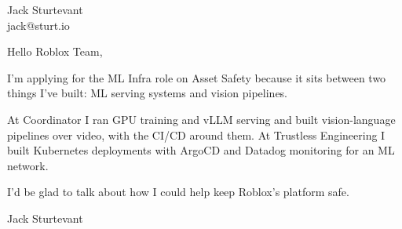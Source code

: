 \documentclass[11pt]{article}
\begin{document}
\raggedright

{\namefont\fontsize{20pt}{24pt}\selectfont Jack Sturtevant}\\[-0.3em]
jack@sturt.io

\vspace{1.2em}

Hello Roblox Team,

I'm applying for the ML Infra role on Asset Safety because it sits between two things I've built: ML serving systems and vision pipelines.

At Coordinator I ran GPU training and vLLM serving and built vision-language pipelines over video, with the CI/CD around them. At Trustless Engineering I built Kubernetes deployments with ArgoCD and Datadog monitoring for an ML network.

I'd be glad to talk about how I could help keep Roblox's platform safe.

\vspace{0.6em}
Jack Sturtevant
\end{document}
